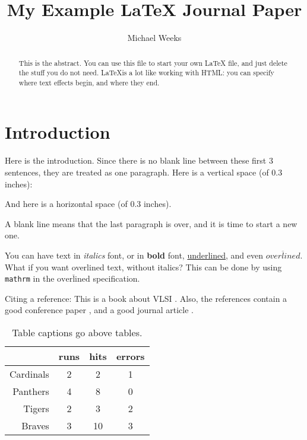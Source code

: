 \documentclass[final]{ieee}
\begin{document}
\title[journal_ex]{My Example LaTeX Journal Paper}
   \author[mcw]{%
   Michael Weeks \\
}



\maketitle


\begin{abstract}
This is the abstract. You can use this file to start your own LaTeX file,
and just delete the stuff you do not need. \LaTeX  is a lot like working
with HTML: you can specify where text effects begin, and where they end.
\end{abstract}

\section{Introduction}\label{sec:intro}
Here is the introduction.
Since there is no blank line between these first 3 sentences, they are
treated as one paragraph.
Here is a vertical space (of 0.3 inches):
\vspace{.3in}

And here is a \hspace{.3in}horizontal space (of 0.3 inches).

A blank line means that the last paragraph is over, and it is time to start
a new one.

You can have text in {\it italics} font, or in {\bf bold} font,
\underline{underlined}, and even $\overline{overlined}$.
What if you want overlined text, without italics? This can
be done by using \verb"mathrm" in the
$\overline{\mathrm{overlined}}$ specification.

Citing a reference: This is a book about VLSI \cite{Weste93}.
Also, the references contain a good conference paper \cite{LiY88},
and a good journal article \cite{BiS92}.


\begin{table}[!hbt]
\begin{center}
  \caption{Table captions go above tables.}
  \vspace{0.2in}
  \begin{tabular}{|r|c|c|c|}
     \hline
 & runs & hits & errors  \\
     \hline
Cardinals  & 2 & 2 & 1  \\
Panthers & 4 & 8 & 0  \\
Tigers  & 2 & 3 & 2  \\
Braves  & 3 & 10 & 3  \\
     \hline
  \end{tabular}
  \label{tab:example_tab}
\end{center}
\end{table}
\end{document}
